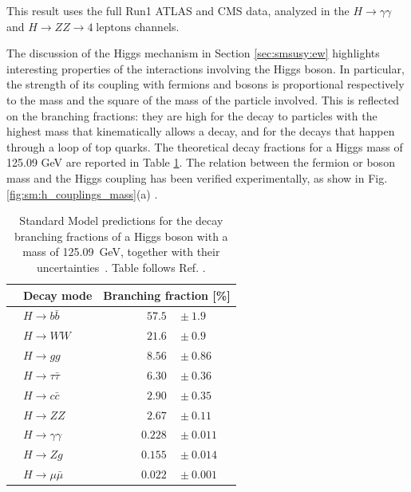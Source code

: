 This result uses the full Run1 ATLAS and CMS data, analyzed in the $H \rightarrow \gamma \gamma$ and $H \rightarrow ZZ \rightarrow 4 \; \mathrm{leptons}$ channels.


The discussion of the Higgs mechanism in Section \ref{sec:smsusy:ew} highlights interesting properties of the interactions involving the Higgs boson. In particular, the strength of its coupling with fermions and bosons is proportional respectively to the mass and the square of the mass of the particle involved. This is reflected on the branching fractions: they are high for the decay to particles with the highest mass that kinematically allows a decay, and for the decays that happen through a loop of top quarks. The theoretical decay fractions for a Higgs mass of 125.09 GeV are reported in Table \ref{tab:SMBranchingFractions}. The relation between the fermion or boson mass and the Higgs coupling has been verified experimentally, as show in Fig. \ref{fig:sm:h_couplings_mass}(a) \cite{Khachatryan:2016vau}. 

\begin{table}[htbp]
\begin{center}
\begin{tabular}{clcr@{\hskip 0.4ex}l} \\ 
\hline
 &    Decay mode &\multicolumn{3}{c}{Branching fraction [\%]}  \\  \hline
 \hline
 &     $H \rightarrow b\bar{b}$       & &   $57.5$&${}\pm 1.9$    \\
 &     $H \rightarrow WW$       & &   $21.6$&${}\pm 0.9$   \\
 &     $H \rightarrow gg$       & &   $8.56$&${}\pm 0.86$  \\
 &     $H \rightarrow \tau \bar{\tau}$       & &   $6.30$&${}\pm 0.36$  \\
 &     $H \rightarrow c\bar{c}$       & &   $2.90$&${}\pm 0.35$  \\
 &     $H \rightarrow ZZ$       & &   $2.67$&${}\pm 0.11$  \\
 &     $H \rightarrow \gamma \gamma$       & &   $0.228$&${}\pm 0.011$  \\
 &     $H \rightarrow Zg$       & &   $0.155$&${}\pm 0.014$  \\
 &     $H \rightarrow \mu \bar{\mu}$       & &   ~~$0.022$&${}\pm 0.001$  \\ 
\hline
\end{tabular} 
\end{center}
\caption{Standard Model predictions for the decay branching fractions of a Higgs boson with a mass of 125.09~GeV, together with their uncertainties~\cite{Heinemeyer:2013tqa}. Table follows Ref. \cite{Khachatryan:2016vau}.}
\label{tab:SMBranchingFractions}
\end{table} 

